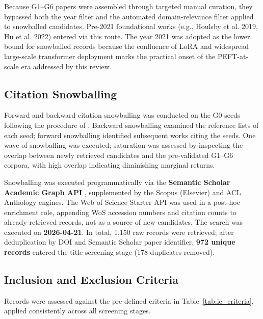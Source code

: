 Because G1--G6 papers were assembled through targeted manual curation, they bypassed both
the year filter and the automated domain-relevance filter applied to snowballed candidates.
Pre-2021 foundational works (e.g., Houlsby et al. 2019, Hu et al. 2022) entered via this
route. The year 2021 was adopted as the lower bound for snowballed records because the
confluence of LoRA \citep{Hu2022} and widespread large-scale transformer deployment marks
the practical onset of the PEFT-at-scale era addressed by this review.

\subsection{Citation Snowballing}
\label{sec:methodology:snowballing}

Forward and backward citation snowballing was conducted on the G0 seeds following the
procedure of \citet{Wohlin2014}. Backward snowballing examined the reference lists of each
seed; forward snowballing identified subsequent works citing the seeds. One wave of
snowballing was executed; saturation was assessed by inspecting the overlap between newly
retrieved candidates and the pre-validated G1--G6 corpora, with high overlap indicating
diminishing marginal returns.

Snowballing was executed programmatically via the \textbf{Semantic Scholar Academic Graph
API} \citep{SemanticScholar2023}, supplemented by the Scopus (Elsevier) and ACL Anthology
engines. The Web of Science Starter API was used in a post-hoc enrichment role, appending
WoS accession numbers and citation counts to already-retrieved records, not as a source of
new candidates. The search was executed on \textbf{2026-04-21}. In total, 1,150 raw
records were retrieved; after deduplication by DOI and Semantic Scholar paper identifier,
\textbf{972 unique records} entered the title screening stage (178 duplicates removed).

\subsection{Inclusion and Exclusion Criteria}
\label{sec:methodology:criteria}

Records were assessed against the pre-defined criteria in
Table~\ref{tab:ie_criteria}, applied consistently across all screening stages.

